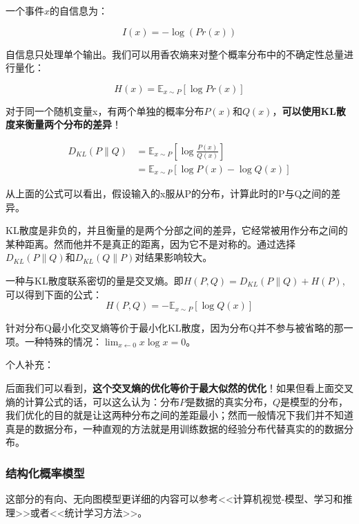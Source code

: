 一个事件$x$的自信息为：

\begin{displaymath}
I(x) = -\log(Pr(x))
\end{displaymath}

自信息只处理单个输出。我们可以用香农熵来对整个概率分布中的不确定性总量进行量化：

\begin{displaymath}
H(x) = \mathbb{E}_{x\sim P}\left[ \log Pr(x) \right]
\end{displaymath}

对于同一个随机变量x，有两个单独的概率分布$P(x)$和$Q(x)$，\textbf{可以使用KL散度来衡量两个分布的差异}！

\begin{align*}
D_{KL}(P \parallel Q) & = \mathbb{E}_{x \sim P} \left[ \log \frac{P(x)}{Q(x)} \right] \\
					& = \mathbb{E}_{x\sim P} \left[ \log P(x) - \log Q(x) \right]
\end{align*}

从上面的公式可以看出，假设输入的x服从P的分布，计算此时的P与Q之间的差异。

KL散度是非负的，并且衡量的是两个分部之间的差异，它经常被用作分布之间的某种距离。然而他并不是真正的距离，因为它不是对称的。通过选择$D_{KL}(P \parallel Q)$和$D_{KL}(Q \parallel P)$对结果影响较大。

一种与KL散度联系密切的量是交叉熵。即$H(P, Q) = D_{KL}(P \parallel Q) + H(P)$, 可以得到下面的公式：
\begin{displaymath}
H(P, Q) = -\mathbb{E}_{x \sim P} \left[ \log Q(x) \right]
\end{displaymath}

针对分布Q最小化交叉熵等价于最小化KL散度，因为分布Q并不参与被省略的那一项。一种特殊的情况：$\lim_{x\leftarrow 0} x\log x = 0$。

个人补充：

后面我们可以看到，\textbf{这个交叉熵的优化等价于最大似然的优化}！如果但看上面交叉熵的计算公式的话，可以这么认为：分布$P$是数据的真实分布，$Q$是模型的分布，我们优化的目的就是让这两种分布之间的差距最小；然而一般情况下我们并不知道真是的数据分布，一种直观的方法就是用训练数据的经验分布代替真实的的数据分布。

\subsubsection{结构化概率模型}

这部分的有向、无向图模型更详细的内容可以参考<<计算机视觉-模型、学习和推理>>或者<<统计学习方法>>。


